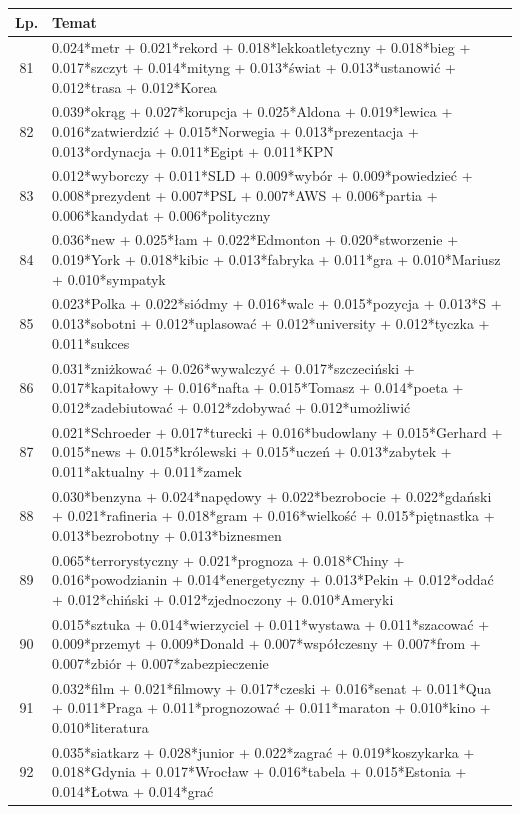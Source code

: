 \documentclass[11pt,a4paper]{article}
\begin{document}
\begin{table}[h]
\begin{tabular}{|c|>{\footnotesize}p{\linewidth}|}
\hline
Lp. & Temat \\\hline

81 & 0.024*metr + 0.021*rekord + 0.018*lekkoatletyczny + 0.018*bieg + 0.017*szczyt + 0.014*mityng + 0.013*świat + 0.013*ustanowić + 0.012*trasa + 0.012*Korea\\\hline
82 & 0.039*okrąg + 0.027*korupcja + 0.025*Aldona + 0.019*lewica + 0.016*zatwierdzić + 0.015*Norwegia + 0.013*prezentacja + 0.013*ordynacja + 0.011*Egipt + 0.011*KPN\\\hline
83 & 0.012*wyborczy + 0.011*SLD + 0.009*wybór + 0.009*powiedzieć + 0.008*prezydent + 0.007*PSL + 0.007*AWS + 0.006*partia + 0.006*kandydat + 0.006*polityczny\\\hline
84 & 0.036*new + 0.025*łam + 0.022*Edmonton + 0.020*stworzenie + 0.019*York + 0.018*kibic + 0.013*fabryka + 0.011*gra + 0.010*Mariusz + 0.010*sympatyk\\\hline
85 & 0.023*Polka + 0.022*siódmy + 0.016*walc + 0.015*pozycja + 0.013*S + 0.013*sobotni + 0.012*uplasować + 0.012*university + 0.012*tyczka + 0.011*sukces\\\hline
86 & 0.031*zniżkować + 0.026*wywalczyć + 0.017*szczeciński + 0.017*kapitałowy + 0.016*nafta + 0.015*Tomasz + 0.014*poeta + 0.012*zadebiutować + 0.012*zdobywać + 0.012*umożliwić\\\hline
87 & 0.021*Schroeder + 0.017*turecki + 0.016*budowlany + 0.015*Gerhard + 0.015*news + 0.015*królewski + 0.015*uczeń + 0.013*zabytek + 0.011*aktualny + 0.011*zamek\\\hline
88 & 0.030*benzyna + 0.024*napędowy + 0.022*bezrobocie + 0.022*gdański + 0.021*rafineria + 0.018*gram + 0.016*wielkość + 0.015*piętnastka + 0.013*bezrobotny + 0.013*biznesmen\\\hline
89 & 0.065*terrorystyczny + 0.021*prognoza + 0.018*Chiny + 0.016*powodzianin + 0.014*energetyczny + 0.013*Pekin + 0.012*oddać + 0.012*chiński + 0.012*zjednoczony + 0.010*Ameryki\\\hline
90 & 0.015*sztuka + 0.014*wierzyciel + 0.011*wystawa + 0.011*szacować + 0.009*przemyt + 0.009*Donald + 0.007*współczesny + 0.007*from + 0.007*zbiór + 0.007*zabezpieczenie\\\hline
91 & 0.032*film + 0.021*filmowy + 0.017*czeski + 0.016*senat + 0.011*Qua + 0.011*Praga + 0.011*prognozować + 0.011*maraton + 0.010*kino + 0.010*literatura\\\hline
92 & 0.035*siatkarz + 0.028*junior + 0.022*zagrać + 0.019*koszykarka + 0.018*Gdynia + 0.017*Wrocław + 0.016*tabela + 0.015*Estonia + 0.014*Łotwa + 0.014*grać\\\hline

\end{tabular}
\end{table}
\end{document}
